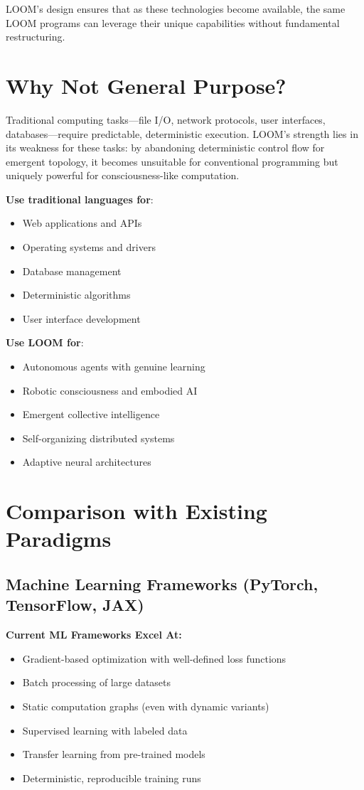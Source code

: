 \documentclass[12pt,a4paper,openany]{book} %
\begin{document}
LOOM's design ensures that as these technologies become available, the same LOOM programs can leverage their unique capabilities without fundamental restructuring.

\section{Why Not General Purpose?}

Traditional computing tasks—file I/O, network protocols, user interfaces, databases—require predictable, deterministic execution. LOOM's strength lies in its weakness for these tasks: by abandoning deterministic control flow for emergent topology, it becomes unsuitable for conventional programming but uniquely powerful for consciousness-like computation.

\textbf{Use traditional languages for}:
\begin{itemize}
\item Web applications and APIs
\item Operating systems and drivers
\item Database management
\item Deterministic algorithms
\item User interface development
\end{itemize}

\textbf{Use LOOM for}:
\begin{itemize}
\item Autonomous agents with genuine learning
\item Robotic consciousness and embodied AI
\item Emergent collective intelligence
\item Self-organizing distributed systems
\item Adaptive neural architectures
\end{itemize}

\section{Comparison with Existing Paradigms}

\subsection{Machine Learning Frameworks (PyTorch, TensorFlow, JAX)}

\textbf{Current ML Frameworks Excel At:}
\begin{itemize}
\item Gradient-based optimization with well-defined loss functions
\item Batch processing of large datasets
\item Static computation graphs (even with dynamic variants)
\item Supervised learning with labeled data
\item Transfer learning from pre-trained models
\item Deterministic, reproducible training runs
\end{itemize}
\end{document}

